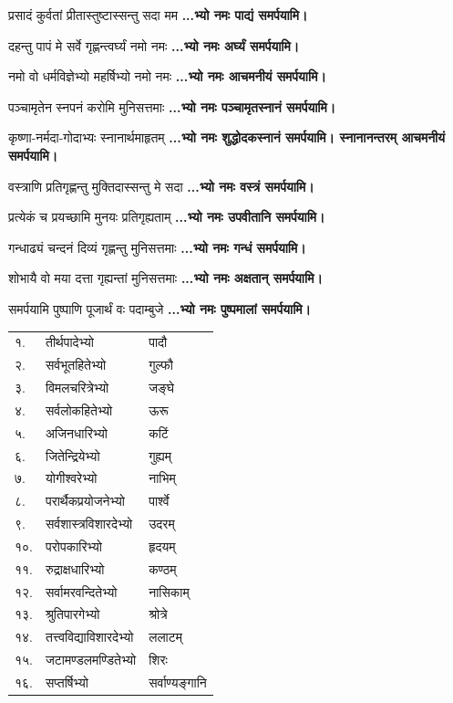{प्रसादं कुर्वतां प्रीतास्तुष्टास्सन्तु सदा मम}
\textbf{...भ्यो नमः पाद्यं समर्पयामि।}

{दहन्तु पापं मे सर्वे गृह्णन्त्वर्घ्यं नमो नमः}
\textbf{...भ्यो नमः अर्घ्यं समर्पयामि।}

{नमो वो धर्मविज्ञेभ्यो महर्षिभ्यो नमो नमः}
\textbf{...भ्यो नमः आचमनीयं समर्पयामि।}

{पञ्चामृतेन स्नपनं करोमि मुनिसत्तमाः}
\textbf{...भ्यो नमः पञ्चामृतस्नानं समर्पयामि।}

{कृष्णा-नर्मदा-गोदाभ्यः स्नानार्थमाहृतम्}
\textbf{...भ्यो नमः शुद्धोदकस्नानं समर्पयामि। स्नानानन्तरम् आचमनीयं समर्पयामि।}

{वस्त्राणि प्रतिगृह्णन्तु मुक्तिदास्सन्तु मे सदा}
\textbf{...भ्यो नमः वस्त्रं समर्पयामि।}

{प्रत्येकं च प्रयच्छामि मुनयः प्रतिगृह्यताम्}
\textbf{...भ्यो नमः उपवीतानि समर्पयामि।}

{गन्धाढ्यं चन्दनं दिव्यं गृह्णन्तु मुनिसत्तमाः}
\textbf{...भ्यो नमः गन्धं समर्पयामि।}

{शोभायै वो मया दत्ता गृह्यन्तां मुनिसत्तमाः}
\textbf{...भ्यो नमः अक्षतान् समर्पयामि।}

{समर्पयामि पुष्पाणि पूजार्थं वः पदाम्बुजे}
\textbf{...भ्यो नमः पुष्पमालां समर्पयामि।}

\begin{longtable}{ll@{~नमः — }l@{~पूजयामि}}
    १. & तीर्थपादेभ्यो & पादौ\\
    २. & सर्वभूतहितेभ्यो & गुल्फौ\\
    ३. & विमलचरित्रेभ्यो & जङ्घे\\
    ४. & सर्वलोकहितेभ्यो & ऊरू\\
    ५. & अजिनधारिभ्यो & कटिं\\
    ६. & जितेन्द्रियेभ्यो & गुह्यम्\\
    ७. & योगीश्वरेभ्यो & नाभिम्\\
    ८. & परार्थैकप्रयोजनेभ्यो & पार्श्वे\\
    ९. & सर्वशास्त्रविशारदेभ्यो & उदरम्\\
    १०. & परोपकारिभ्यो & हृदयम्\\
    ११. & रुद्राक्षधारिभ्यो & कण्ठम्\\
    १२. & सर्वामरवन्दितेभ्यो & नासिकाम्\\
    १३. & श्रुतिपारगेभ्यो & श्रोत्रे\\
    १४. & तत्त्वविद्याविशारदेभ्यो & ललाटम्\\
    १५. & जटामण्डलमण्डितेभ्यो & शिरः\\
    १६. & सप्तर्षिभ्यो & सर्वाण्यङ्गानि\\
\end{longtable}

